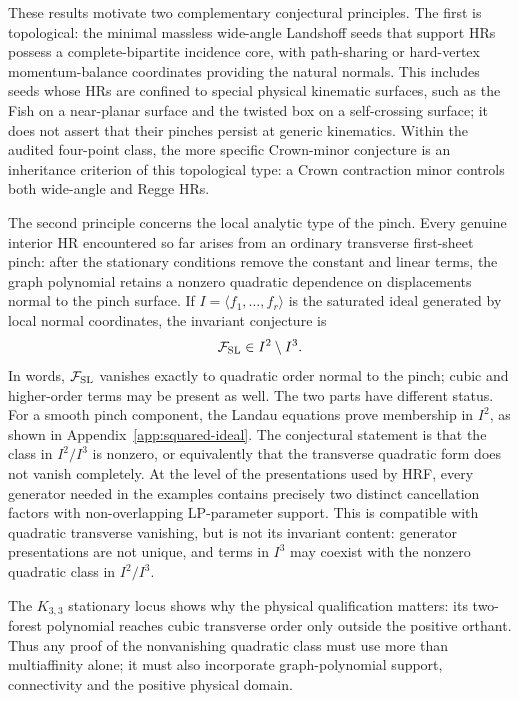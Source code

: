 \documentclass[a4paper,11pt]{article}
\begin{document}
These results motivate two complementary conjectural principles.  The first is
topological: the minimal massless wide-angle Landshoff seeds that support HRs
possess a complete-bipartite incidence core, with path-sharing or hard-vertex
momentum-balance coordinates providing the natural normals.  This includes
seeds whose HRs are confined to special physical kinematic surfaces, such as
the Fish on a near-planar surface and the twisted box on a self-crossing
surface; it does not assert that their pinches persist at generic kinematics.
Within the audited four-point class, the more specific Crown-minor conjecture
is an inheritance criterion of this topological type: a Crown contraction
minor controls both wide-angle and Regge HRs.

The second principle concerns the local analytic type of the pinch.  Every
genuine interior HR encountered so far arises from an ordinary transverse
first-sheet pinch: after the stationary conditions remove the constant and
linear terms, the graph polynomial retains a nonzero quadratic dependence on
displacements normal to the pinch surface.  If
\(I=\langle f_1,\ldots,f_r\rangle\) is the saturated ideal generated by local
normal coordinates, the invariant conjecture is
\begin{equation}
 \mathcal F_{\rm SL}\in I^2\setminus I^3.
 \label{eq:ordinary-positive-HR-conjecture}
\end{equation}
In words, \(\mathcal F_{\rm SL}\) vanishes exactly to quadratic order normal to
the pinch; cubic and higher-order terms may be present as well.
The two parts have different status.  For a smooth pinch component, the Landau
equations prove membership in \(I^2\), as shown in
Appendix~\ref{app:squared-ideal}.  The conjectural statement is that the class
in \(I^2/I^3\) is nonzero, or equivalently that the transverse quadratic form
does not vanish completely.  At the level of the presentations used by HRF,
every generator needed in the examples contains precisely two distinct
cancellation factors with non-overlapping LP-parameter support.  This is
compatible with quadratic transverse vanishing, but is not its invariant
content: generator presentations are not unique, and terms in \(I^3\) may
coexist with the nonzero quadratic class in \(I^2/I^3\).

The \(K_{3,3}\) stationary locus shows why the physical qualification matters:
its two-forest polynomial reaches cubic transverse order only outside the
positive orthant.  Thus any proof of the nonvanishing quadratic class must use
more than multiaffinity alone; it must also incorporate graph-polynomial
support, connectivity and the positive physical domain.
\end{document}

